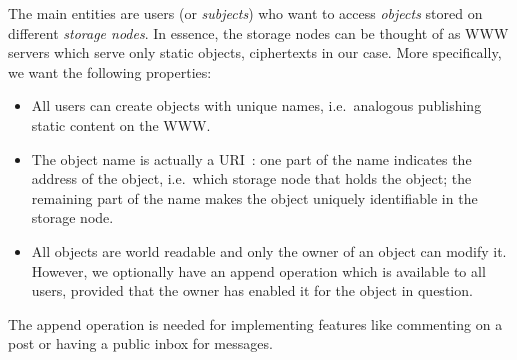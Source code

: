 
The main entities are users (or \emph{subjects}) who want to access 
\emph{objects} stored on different \emph{storage nodes}.
In essence, the storage nodes can be thought of as \ac{WWW} servers which serve 
only static objects, ciphertexts in our case.
More specifically, we want the following properties:
\begin{itemize}
  \item All users can create objects with unique names, i.e.\ analogous 
    publishing static content on the \ac{WWW}.
  \item The object name is actually a \ac{URI}~\cite{rfc3986}:
    one part of the name indicates the address of the object, i.e.\ which 
    storage node that holds the object;
    the remaining part of the name makes the object uniquely identifiable in 
    the storage node.
  \item All objects are world readable and only the owner of an object can 
    modify it.
    However, we optionally have an append operation which is available to all 
    users, provided that the owner has enabled it for the object in question.
\end{itemize}
The append operation is needed for implementing features like commenting on 
a post or having a public inbox for messages.

